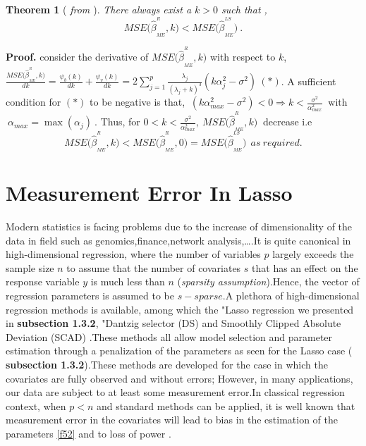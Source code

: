 \documentclass[12pt]{report}
\newtheorem{theoreme}{Theorem}[section] %
\begin{document}
	\begin{theoreme}[ \textit{from \cite{nref6}}]
		There always exist a $k>0$ such that ,
		\begin{equation}
				MSE\big(\hat{\beta}^{^{R}}_{_{ME}},k\big)< MSE\big(\hat{\beta}^{^{LS}}_{_{ME}}\big)\ .
		\end{equation}
	\end{theoreme}
\textbf{Proof.} consider the derivative of $MSE\big(\hat{\beta}^{^{R}}_{_{ME}},k\big)$ with respect to $k$, $\frac{MSE\big(\hat{\beta}^{^{R}}_{_{ME}},k\big)}{dk}=\frac{\psi_{b}(k)}{dk}+\frac{\psi_{v}(k)}{dk}=2 \sum_{j=1}^{p}\frac{\lambda_{j}}{(\lambda_{j}+k)^{3}}(k\alpha_{j}^{2}-\sigma^{2})\ (\ast)$. A sufficient condition for $(\ast)$ to be negative is that, $\ (k\alpha_{max}^{2}-\sigma^{2})<0\Rightarrow k<\frac{\sigma^{2}}{\alpha^{2}_{max}}\ $ with $\ \alpha_{max}=\max(\alpha_{j})\ $. Thus, for $0<k<\frac{\sigma^{2}}{\alpha^{2}_{max}},\ 	MSE\big(\hat{\beta}^{^{R}}_{_{ME}},k\big)\ $ decrease i.e
$$	MSE\big(\hat{\beta}^{^{R}}_{_{ME}},k\big)<MSE\big(\hat{\beta}^{^{R}}_{_{ME}},0\big)= MSE\big(\hat{\beta}^{^{LS}}_{_{ME}}\big)\ \ as\ required.$$
\section{Measurement Error In Lasso}
Modern  statistics is facing problems due to the increase of dimensionality of the data in field such as genomics,finance,network analysis,\dots .It is quite canonical in high-dimensional regression, where the number of variables $p$  largely exceeds the sample size $n$ to assume that the number of covariates $s$ that has an effect on the response variable $y$ is much less than $n$ (\textit{sparsity assumption}).Hence, the vector of regression parameters is assumed to be $s-sparse$.A plethora of high-dimensional regression methods is available, among which the "Lasso regression \cite{nref9} we presented in \textbf{ subsection 1.3.2}, "Dantzig selector (DS) \cite{nref2} and Smoothly Clipped Absolute Deviation (SCAD) \cite{nref3}.These methods all allow model selection and parameter estimation through a penalization of the parameters as seen for the Lasso case (\textbf{ subsection 1.3.2}).These methods are developed for the case in which the covariates are fully observed and without errors; However, in many applications, our data are subject to at least some measurement error.In classical regression context, when $p<n$ and standard methods can be applied, it is well known that measurement error in the covariates will lead to bias in the estimation of the parameters \eqref{f52} and to loss of power \cite{nref5}.
\end{document}

